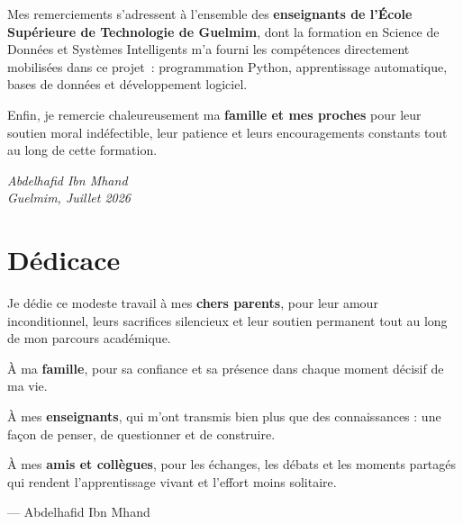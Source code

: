 \documentclass[12pt,a4paper]{report}
\begin{document}
Mes remerciements s'adressent à l'ensemble des \textbf{enseignants de l'École Supérieure de Technologie de Guelmim}, dont la formation en Science de Données et Systèmes Intelligents m'a fourni les compétences directement mobilisées dans ce projet~: programmation Python, apprentissage automatique, bases de données et développement logiciel.

Enfin, je remercie chaleureusement ma \textbf{famille et mes proches} pour leur soutien moral indéfectible, leur patience et leurs encouragements constants tout au long de cette formation.

\vspace{1.5cm}
\begin{flushright}
  \textit{Abdelhafid Ibn Mhand}\\
  \textit{Guelmim, Juillet 2026}
\end{flushright}

\newpage
\chapter*{Dédicace}
\thispagestyle{empty}

\vspace*{3cm}
\begin{center}
\begin{minipage}{0.72\textwidth}
\setlength{\parskip}{10pt}
\centering\itshape\large

Je dédie ce modeste travail à mes \textbf{chers parents}, pour leur amour inconditionnel, leurs sacrifices silencieux et leur soutien permanent tout au long de mon parcours académique.

\vspace{0.5cm}
À ma \textbf{famille}, pour sa confiance et sa présence dans chaque moment décisif de ma vie.

\vspace{0.5cm}
À mes \textbf{enseignants}, qui m'ont transmis bien plus que des connaissances : une façon de penser, de questionner et de construire.

\vspace{0.5cm}
À mes \textbf{amis et collègues}, pour les échanges, les débats et les moments partagés qui rendent l'apprentissage vivant et l'effort moins solitaire.

\vspace{1.5cm}
{\normalsize\upshape --- Abdelhafid Ibn Mhand}
\end{minipage}
\end{center}
\end{document}
